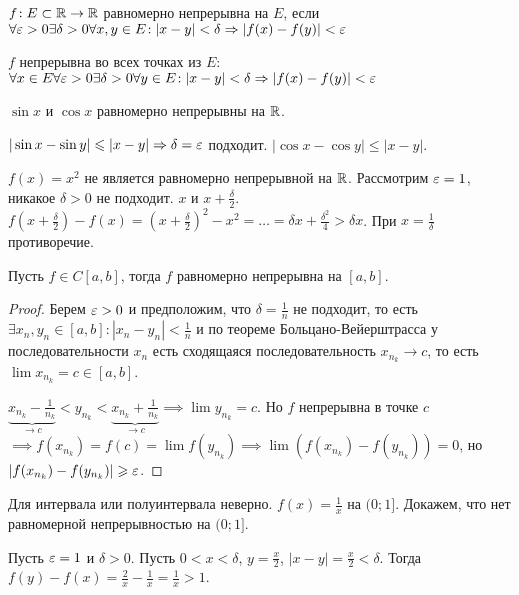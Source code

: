 \begin{definition}
    $f\!: E \subset \mathbb{R} \to \mathbb{R}$ равномерно непрерывна на  $E$, если  $\forall \varepsilon > 0 \exists \delta > 0 \forall x, y \in E\!: |x-y| < \delta \Rightarrow |f(x)-f(y)| < \varepsilon$
\end{definition}
\begin{definition}
    $f$ непрерывна во всех точках из  $E$:\\
    $\forall x \in E \forall \varepsilon > 0 \exists \delta > 0 \forall y \in E\!: |x-y| < \delta \Rightarrow |f(x)-f(y)| < \varepsilon$
\end{definition}
\begin{example}
    $\sin x$ и  $\cos x$ равномерно непрерывны на  $\mathbb{R}$.

     $|\sin x - \sin y| \leqslant |x-y| \Rightarrow \delta = \varepsilon$ подходит. $|\cos x - \cos y| \le |x-y|$.
\end{example}
\begin{example}
    $f(x) = x^2$ не является равномерно непрерывной на $\mathbb{R}$. Рассмотрим  $\varepsilon = 1$, никакое  $\delta > 0$ не подходит.  $x$ и  $x + \frac{\delta}{2}$. $f(x + \frac{\delta}{2}) - f(x)  = (x+\frac{\delta}{2})^2 - x^2 = \ldots = \delta x + \frac{\delta^2}{4} > \delta x$.
    При $x = \frac{1}{\delta}$ противоречие. 
\end{example}
\begin{theorem}
    Пусть $f \in C[a, b]$, тогда $f$ равномерно непрерывна на  $[a, b]$.
\end{theorem}
\begin{proof}
    Берем $\varepsilon > 0$ и предположим, что  $\delta = \frac{1}{n}$ не подходит, то есть $\exists x_n, y_n \in [a, b]\!: |x_n - y_n| < \frac{1}{n}$ и по теореме Больцано-Вейерштрасса у последовательности $x_n$ есть сходящаяся последовательность  $x_{n_k} \to c$, то есть  $\lim x_{n_k} = c \in [a, b]$.

    $\underbrace{x_{n_k} - \frac{1}{n_k}}_{\to c} < y_{n_k} < \underbrace{x_{n_k} + \frac{1}{n_k}}_{\to c} \implies \lim y_{n_k} = c$. Но $f$ непрерывна в точке  $c$  $\implies f(x_{n_k}) = f(c) = \lim f(y_{n_k}) \implies \lim (f(x_{n_k}) - f(y_{n_k})) = 0$, но $|f(x_{n_k}) - f(y_{n_k})| \geqslant \varepsilon$. 
\end{proof}
\begin{remark}
    Для интервала или полуинтервала неверно. $f(x) = \frac{1}{x}$ на $(0; 1]$. Докажем, что нет равномерной непрерывностью на  $(0; 1]$. 

    Пусть  $\varepsilon = 1$ и  $\delta > 0$. Пусть  $0 < x < \delta$,  $y = \frac{x}{2}$, $|x-y| = \frac{x}{2} < \delta$. Тогда $f(y) - f(x) = \frac{2}{x} - \frac{1}{x} = \frac{1}{x} > 1$.
\end{remark}

